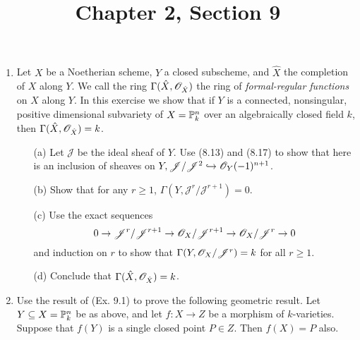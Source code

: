 \documentclass{article}
\title{Chapter 2, Section 9}
\begin{document}
\maketitle
\begin{enumerate} [label=\textbf{\arabic*.}, leftmargin=0em]

\item Let $X$ be a Noetherian scheme, $Y$ a closed subscheme, and $\hat{X}$ the completion of $X$ along $Y$. We call the ring $\Gamma(\hat{X}, \mathscr{O}_{\hat{X}})$ the ring of \textit{formal-regular functions} on $X$ along $Y$. In this exercise we show that if $Y$ is a connected, nonsingular, positive dimensional subvariety of $X = \mathbb{P}_k^n$ over an algebraically closed field $k$, then $\Gamma(\hat{X}, \mathscr{O}_{\hat{X}}) = k$.
\begin{itemize}
    \item[(a)] Let $\mathscr{J}$ be the ideal sheaf of $Y$. Use (8.13) and (8.17) to show that here is an inclusion of sheaves on $Y, \mathscr{J} / \mathscr{J}^2 \hookrightarrow \mathscr{O}_Y(-1)^{n + 1}$.
    \item[(b)] Show that for any $r \geq 1$, $\Gamma(Y, \mathscr{J}^r / \mathscr{J}^{r + 1}) = 0$.
    \item[(c)] Use the exact sequences
    \begin{equation*}
        0 \to \mathscr{J}^r / \mathscr{J}^{r + 1} \to \mathscr{O}_X / \mathscr{J}^{r + 1} \to \mathscr{O}_X / \mathscr{J}^r \to 0
    \end{equation*}
    and induction on $r$ to show that $\Gamma(Y, \mathscr{O}_X/\mathscr{J}^r) = k$ for all $r \geq 1$.
    \item[(d)] Conclude that $\Gamma(\hat{X}, \mathscr{O}_{\hat{X}}) = k$.
\end{itemize}

\item Use the result of (Ex. 9.1) to prove the following geometric result. Let $Y \subseteq X = \mathbb{P}_k^n$ be as above, and let $f : X \to Z$ be a morphism of $k$-varieties. Suppose that $f(Y)$ is a single closed point $P \in Z$. Then $f(X) = P$ also.


\end{enumerate}
\end{document}
